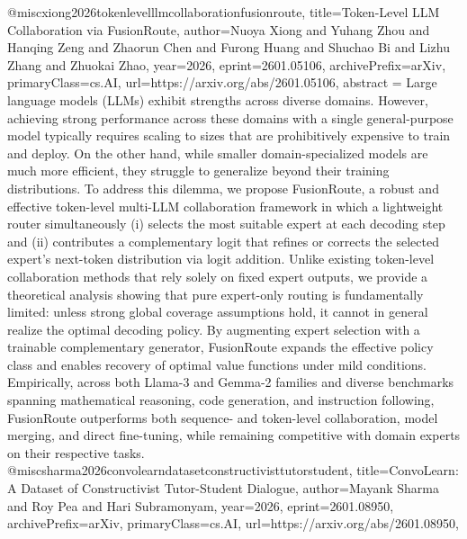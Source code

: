 {}@misc{xiong2026tokenlevelllmcollaborationfusionroute,
      title={Token-Level LLM Collaboration via FusionRoute}, 
      author={Nuoya Xiong and Yuhang Zhou and Hanqing Zeng and Zhaorun Chen and Furong Huang and Shuchao Bi and Lizhu Zhang and Zhuokai Zhao},
      year={2026},
      eprint={2601.05106},
      archivePrefix={arXiv},
      primaryClass={cs.AI},
      url={https://arxiv.org/abs/2601.05106},
      abstract = {Large language models (LLMs) exhibit strengths across diverse domains. However, achieving strong performance across these domains with a single general-purpose model typically requires scaling to sizes that are prohibitively expensive to train and deploy. On the other hand, while smaller domain-specialized models are much more efficient, they struggle to generalize beyond their training distributions. To address this dilemma, we propose FusionRoute, a robust and effective token-level multi-LLM collaboration framework in which a lightweight router simultaneously (i) selects the most suitable expert at each decoding step and (ii) contributes a complementary logit that refines or corrects the selected expert's next-token distribution via logit addition. Unlike existing token-level collaboration methods that rely solely on fixed expert outputs, we provide a theoretical analysis showing that pure expert-only routing is fundamentally limited: unless strong global coverage assumptions hold, it cannot in general realize the optimal decoding policy. By augmenting expert selection with a trainable complementary generator, FusionRoute expands the effective policy class and enables recovery of optimal value functions under mild conditions. Empirically, across both Llama-3 and Gemma-2 families and diverse benchmarks spanning mathematical reasoning, code generation, and instruction following, FusionRoute outperforms both sequence- and token-level collaboration, model merging, and direct fine-tuning, while remaining competitive with domain experts on their respective tasks.}
}@misc{sharma2026convolearndatasetconstructivisttutorstudent,
      title={ConvoLearn: A Dataset of Constructivist Tutor-Student Dialogue}, 
      author={Mayank Sharma and Roy Pea and Hari Subramonyam},
      year={2026},
      eprint={2601.08950},
      archivePrefix={arXiv},
      primaryClass={cs.AI},
      url={https://arxiv.org/abs/2601.08950},
}
